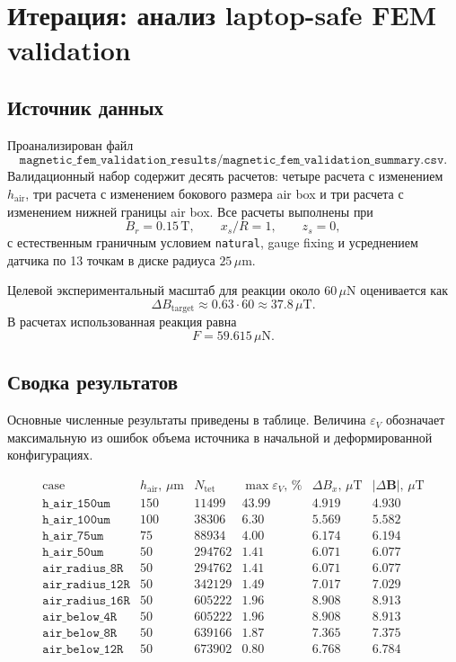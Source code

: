 \documentclass[12pt,a4paper]{article}
\begin{document}
\section{Итерация: анализ laptop-safe FEM validation}

\subsection*{Источник данных}

Проанализирован файл
\[
    \texttt{magnetic\_fem\_validation\_results/magnetic\_fem\_validation\_summary.csv}.
\]
Валидационный набор содержит десять расчетов: четыре расчета с изменением
\(h_{\mathrm{air}}\), три расчета с изменением бокового размера air box и три
расчета с изменением нижней границы air box. Все расчеты выполнены при
\[
    B_r = 0.15\,\mathrm{T},\qquad
    x_s/R = 1,\qquad
    z_s = 0,
\]
с естественным граничным условием \texttt{natural}, gauge fixing и усреднением
датчика по 13 точкам в диске радиуса \(25\,\mu\mathrm{m}\).

Целевой экспериментальный масштаб для реакции около \(60\,\mu\mathrm{N}\)
оценивается как
\[
    \Delta B_{\mathrm{target}}
    \approx 0.63\cdot 60
    \approx 37.8\,\mu\mathrm{T}.
\]
В расчетах использованная реакция равна
\[
    F = 59.615\,\mu\mathrm{N}.
\]

\subsection*{Сводка результатов}

Основные численные результаты приведены в таблице. Величина
\(\varepsilon_V\) обозначает максимальную из ошибок объема источника в начальной
и деформированной конфигурациях.

\[
\begin{array}{lrrrrr}
\text{case} &
h_{\mathrm{air}},\,\mu\mathrm{m} &
N_{\mathrm{tet}} &
\max\varepsilon_V,\,\% &
\Delta B_x,\,\mu\mathrm{T} &
|\Delta\mathbf B|,\,\mu\mathrm{T}
\\
\hline
\texttt{h\_air\_150um} & 150 & 11499  & 43.99 & 4.919 & 4.930\\
\texttt{h\_air\_100um} & 100 & 38306  & 6.30  & 5.569 & 5.582\\
\texttt{h\_air\_75um}  & 75  & 88934  & 4.00  & 6.174 & 6.194\\
\texttt{h\_air\_50um}  & 50  & 294762 & 1.41  & 6.071 & 6.077\\
\texttt{air\_radius\_8R}  & 50 & 294762 & 1.41 & 6.071 & 6.077\\
\texttt{air\_radius\_12R} & 50 & 342129 & 1.49 & 7.017 & 7.029\\
\texttt{air\_radius\_16R} & 50 & 605222 & 1.96 & 8.908 & 8.913\\
\texttt{air\_below\_4R}  & 50 & 605222 & 1.96 & 8.908 & 8.913\\
\texttt{air\_below\_8R}  & 50 & 639166 & 1.87 & 7.365 & 7.375\\
\texttt{air\_below\_12R} & 50 & 673902 & 0.80 & 6.768 & 6.784
\end{array}
\]
\end{document}
